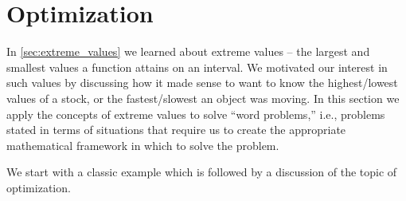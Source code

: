 \section{Optimization}\label{sec:optimization}

In \autoref{sec:extreme_values} we learned about extreme values -- the largest and smallest values a function attains on an interval. We motivated our interest in such values by discussing how it made sense to want to know the highest/lowest values of a stock, or the fastest/slowest an object was moving. In this section we apply the concepts of extreme values to solve ``word problems,'' i.e., problems stated in terms of situations that require us to create the appropriate mathematical framework in which to solve the problem.


We start with a classic example which is followed by a discussion of the topic of optimization.

